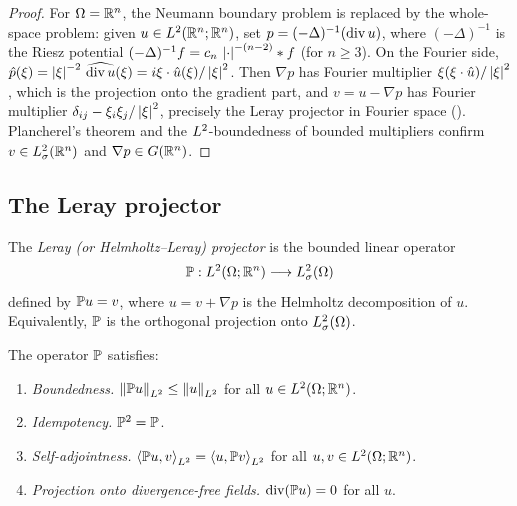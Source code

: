 \begin{proof}
  For $\Omega = \mathbb{R}^{n}$, the Neumann boundary problem is replaced by the whole-space
  problem: given $u \in L^{2}(\mathbb{R}^n;\mathbb{R}^n)$, set $p = (-\Delta)^{-1}(\operatorname{div} u)$,
  where $(-\Delta)^{-1}$ is the Riesz potential $(-\Delta)^{-1}f = c_n\,\left\lvert \cdot \right\rvert^{-(n-2)}
  * f$ (for $n \geq 3$).  On the Fourier side, $\hat{p}(\xi) = \left\lvert \xi \right\rvert^{-2}\,
  \widehat{\operatorname{div} u}(\xi) = i\xi \cdot \hat{u}(\xi)/\left\lvert \xi \right\rvert^2$.  Then
  $\nabla p$ has Fourier multiplier $\xi(\xi\cdot\hat{u})/\left\lvert \xi \right\rvert^2$, which is the
  projection onto the gradient part, and $v = u - \nabla p$ has Fourier multiplier
  $\delta_{ij} - \xi_i\xi_j/\left\lvert \xi \right\rvert^2$, precisely the Leray projector in Fourier space
  ().  Plancherel's theorem and the $L^{2}$-boundedness
  of bounded multipliers confirm $v \in L^{2}_\sigma(\mathbb{R}^n)$ and $\nabla p \in G(\mathbb{R}^n)$.
\end{proof}

\subsection{The Leray projector}

\begin{definition}\label{def:leray-projector}
  The \emph{Leray (or Helmholtz--Leray) projector} is the bounded linear operator
  \[
    \mathbb{P} : L^{2}(\Omega;\mathbb{R}^{n}) \longrightarrow L^{2}_\sigma(\Omega)
  \]
  defined by $\mathbb{P} u = v$, where $u = v + \nabla p$ is the Helmholtz decomposition of
  $u$.  Equivalently, $\mathbb{P}$ is the orthogonal projection onto $L^{2}_\sigma(\Omega)$.
\end{definition}

\begin{proposition}\label{prop:leray-props}
  The operator $\mathbb{P}$ satisfies:
  \begin{enumerate}[label=(\roman*)]
    \item \emph{Boundedness.} $\left\lVert \mathbb{P} u \right\rVert_{L^{2}} \le \left\lVert u \right\rVert_{L^{2}}$ for all
      $u \in L^{2}(\Omega;\mathbb{R}^{n})$.
    \item \emph{Idempotency.} $\mathbb{P}^{2} = \mathbb{P}$.
    \item \emph{Self-adjointness.} $\left\langle \mathbb{P} u, v \right\rangle_{L^{2}} = \left\langle u, \mathbb{P}
      v \right\rangle_{L^{2}}$ for all $u, v \in L^{2}(\Omega;\mathbb{R}^{n})$.
    \item \emph{Projection onto divergence-free fields.} $\operatorname{div}(\mathbb{P} u) = 0$ for
      all $u$.
  \end{enumerate}
\end{proposition}


